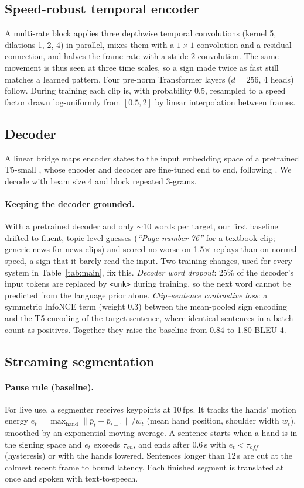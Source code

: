 \documentclass[11pt]{article}
\begin{document}
\subsection{Speed-robust temporal encoder}
A multi-rate block applies three depthwise temporal convolutions (kernel 5, dilations 1, 2, 4) in
parallel, mixes them with a $1{\times}1$ convolution and a residual connection, and halves the frame
rate with a stride-2 convolution. The same movement is thus seen at three time scales, so a sign made
twice as fast still matches a learned pattern. Four pre-norm Transformer layers ($d{=}256$, 4 heads)
follow. During training each clip is, with probability 0.5, resampled to a speed factor drawn
log-uniformly from $[0.5, 2]$ by linear interpolation between frames.

\subsection{Decoder}
A linear bridge maps encoder states to the input embedding space of a pretrained T5-small
\citep{raffel2020t5}, whose encoder and decoder are fine-tuned end to end, following
\citet{dhamecha2026temporal}. We decode with beam size 4 and block repeated 3-grams.

\paragraph{Keeping the decoder grounded.} With a pretrained decoder and only $\sim$10 words per target,
our first baseline drifted to fluent, topic-level guesses (\emph{``Page number 76''} for a textbook
clip; generic news for news clips) and scored no worse on 1.5$\times$ replays than on normal speed, a
sign that it barely read the input. Two training changes, used for every system in
Table~\ref{tab:main}, fix this. \emph{Decoder word dropout}: 25\% of the decoder's input tokens are
replaced by \texttt{<unk>} during training, so the next word cannot be predicted from the language prior
alone. \emph{Clip--sentence contrastive loss}: a symmetric InfoNCE term (weight 0.3) between the
mean-pooled sign encoding and the T5 encoding of the target sentence, where identical sentences in a
batch count as positives. Together they raise the baseline from 0.84 to 1.80 BLEU-4.

\subsection{Streaming segmentation}
\paragraph{Pause rule (baseline).} For live use, a segmenter receives keypoints at 10\,fps. It tracks the hands' motion energy
$e_t = \max_{\text{hand}} \lVert \bar{p}_t - \bar{p}_{t-1} \rVert / w_t$ (mean hand position, shoulder
width $w_t$), smoothed by an exponential moving average. A sentence starts when a hand is in the
signing space and $e_t$ exceeds $\tau_{on}$, and ends after 0.6\,s with $e_t < \tau_{off}$ (hysteresis)
or with the hands lowered. Sentences longer than 12\,s are cut at the calmest recent frame to bound
latency. Each finished segment is translated at once and spoken with text-to-speech.
\end{document}
